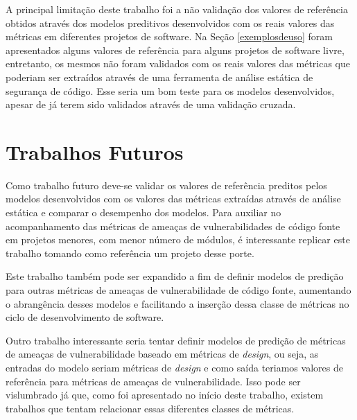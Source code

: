 A principal limitação deste trabalho foi a não validação dos valores de
referência obtidos através dos modelos preditivos desenvolvidos com os reais
valores das métricas em diferentes projetos de software. Na Seção
\ref{exemplosdeuso} foram apresentados alguns valores de referência para alguns
projetos de software livre, entretanto, os mesmos não foram validados com os
reais valores das métricas que poderiam ser extraídos através de uma ferramenta
de análise estática de segurança de código. Esse seria um bom teste para os
modelos desenvolvidos, apesar de já terem sido validados através de uma
validação cruzada.

\section{Trabalhos Futuros}

Como trabalho futuro deve-se validar os valores de referência preditos pelos
modelos desenvolvidos com os valores das métricas extraídas através de análise
estática e comparar o desempenho dos modelos. Para auxiliar no acompanhamento
das métricas de ameaças de vulnerabilidades de código fonte em projetos menores,
com menor número de módulos, é interessante replicar este trabalho tomando como
referência um projeto desse porte.

Este trabalho também pode ser expandido a fim de definir modelos de predição
para outras métricas de ameaças de vulnerabilidade de código fonte, aumentando o
abrangência desses modelos e facilitando a inserção dessa classe de métricas no
ciclo de desenvolvimento de software.

Outro trabalho interessante seria tentar definir modelos de predição de métricas de
ameaças de vulnerabilidade baseado em métricas de \textit{design}, ou seja, as
entradas do modelo seriam métricas de \textit{design} e como saída teriamos
valores de referência para métricas de ameaças de vulnerabilidade. Isso pode ser
vislumbrado já que, como foi apresentado no início deste trabalho, existem
trabalhos que tentam relacionar essas diferentes classes de métricas.
